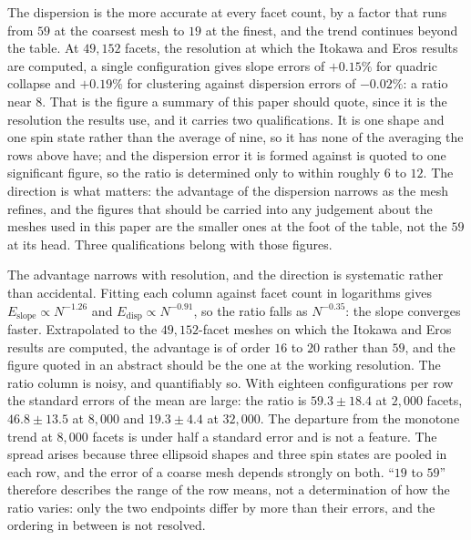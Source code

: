 The dispersion is the more accurate at every facet count, by a factor that
runs from $59$ at the coarsest mesh to $19$ at the finest, and the trend
continues beyond the table. At $49{,}152$ facets, the resolution at which the
Itokawa and Eros results are computed, a single configuration gives slope
errors of $+0.15\%$ for quadric collapse and $+0.19\%$ for clustering
against dispersion errors of $-0.02\%$: a ratio near $8$. That is the figure
a summary of this paper should quote, since it is the resolution the results
use, and it carries two qualifications. It is one shape and one spin state
rather than the average of nine, so it has none of the averaging the rows
above have; and the dispersion error it is formed against is quoted to one
significant figure, so the ratio is determined only to within roughly $6$ to
$12$. The direction is what matters:
the advantage of the dispersion narrows as the mesh refines, and the figures
that should be carried into any judgement about the meshes used in this
paper are the smaller ones at the foot of the table, not the $59$ at its
head. Three qualifications belong with those figures.

The advantage narrows with resolution, and the direction is systematic
rather than accidental. Fitting each column against facet count in
logarithms gives $E_{\mathrm{slope}} \propto N^{-1.26}$ and
$E_{\mathrm{disp}} \propto N^{-0.91}$, so the ratio falls as $N^{-0.35}$:
the slope converges faster. Extrapolated to the $49{,}152$-facet meshes on
which the Itokawa and Eros results are computed, the advantage is of order
$16$ to $20$ rather than $59$, and the figure quoted in an abstract should be
the one at the working resolution. The ratio column is noisy, and quantifiably so. With eighteen
configurations per row the standard errors of the mean are large: the ratio
is $59.3\pm18.4$ at $2{,}000$ facets, $46.8\pm13.5$ at $8{,}000$ and
$19.3\pm4.4$ at $32{,}000$. The departure from the monotone trend at
$8{,}000$ facets is under half a standard error and is not a feature. The
spread arises because three ellipsoid shapes and three spin states are
pooled in each row, and the error of a coarse mesh depends strongly on
both. ``$19$ to $59$'' therefore describes the range of the row means, not a
determination of how the ratio varies: only the two endpoints differ by more
than their errors, and the ordering in between is not resolved.

